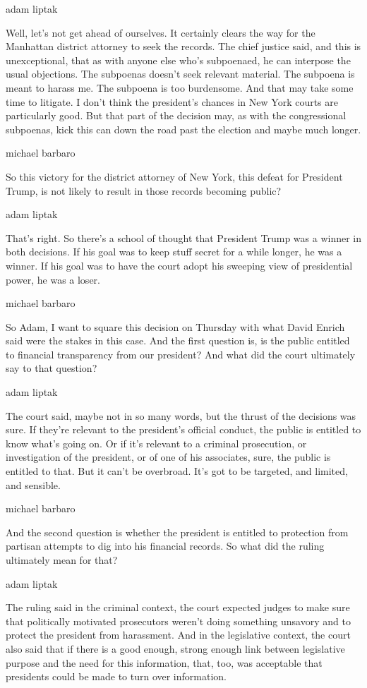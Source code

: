 adam liptak

Well, let's not get ahead of ourselves. It certainly clears the way for
the Manhattan district attorney to seek the records. The chief justice
said, and this is unexceptional, that as with anyone else who's
subpoenaed, he can interpose the usual objections. The subpoenas doesn't
seek relevant material. The subpoena is meant to harass me. The subpoena
is too burdensome. And that may take some time to litigate. I don't
think the president's chances in New York courts are particularly good.
But that part of the decision may, as with the congressional subpoenas,
kick this can down the road past the election and maybe much longer.

michael barbaro

So this victory for the district attorney of New York, this defeat for
President Trump, is not likely to result in those records becoming
public?

adam liptak

That's right. So there's a school of thought that President Trump was a
winner in both decisions. If his goal was to keep stuff secret for a
while longer, he was a winner. If his goal was to have the court adopt
his sweeping view of presidential power, he was a loser.

michael barbaro

So Adam, I want to square this decision on Thursday with what David
Enrich said were the stakes in this case. And the first question is, is
the public entitled to financial transparency from our president? And
what did the court ultimately say to that question?

adam liptak

The court said, maybe not in so many words, but the thrust of the
decisions was sure. If they're relevant to the president's official
conduct, the public is entitled to know what's going on. Or if it's
relevant to a criminal prosecution, or investigation of the president,
or of one of his associates, sure, the public is entitled to that. But
it can't be overbroad. It's got to be targeted, and limited, and
sensible.

michael barbaro

And the second question is whether the president is entitled to
protection from partisan attempts to dig into his financial records. So
what did the ruling ultimately mean for that?

adam liptak

The ruling said in the criminal context, the court expected judges to
make sure that politically motivated prosecutors weren't doing something
unsavory and to protect the president from harassment. And in the
legislative context, the court also said that if there is a good enough,
strong enough link between legislative purpose and the need for this
information, that, too, was acceptable that presidents could be made to
turn over information.

